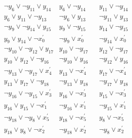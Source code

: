 \documentclass{base}
\begin{document}
\begin{align*}
	&\neg y_{6}\lor \neg y_{11}\lor y_{14} & y_{6}\lor \neg y_{14} && y_{11}\lor \neg y_{14}\\
	&y_{6}\lor y_{11}\lor \neg y_{13} & \neg y_{6} \lor y_{13} && \neg y_{11} \lor y_{13}\\
	&\neg y_{9}\lor \neg y_{14}\lor y_{15} & y_{9}\lor \neg y_{15} && y_{14}\lor \neg y_{15}\\
	&y_{9}\lor y_{14}\lor \neg x{_0^'} & \neg y_{9} \lor  x{_0^'} && \neg y_{14} \lor  x{_0^'}\\
	&\neg y_{10}\lor \neg y_{12}\lor y_{17} & y_{10}\lor \neg y_{17} && y_{12}\lor \neg y_{17}\\
	&y_{10}\lor y_{12}\lor \neg y_{16} & \neg y_{10} \lor y_{16} && \neg y_{12} \lor y_{16}\\
	&\neg y_{13}\lor \neg y_{17}\lor x{_4^'} & y_{13}\lor \neg x{_4^'} && y_{17}\lor \neg x{_4^'}\\
	&y_{13}\lor y_{17}\lor \neg y_{18} & \neg y_{13} \lor  y_{18} && \neg y_{17} \lor y_{18}\\
	&\neg y_{16}\lor \neg y_{15}\lor x{_3^'} & y_{16}\lor \neg x{_3^'} && y_{15}\lor \neg x{_3^'}\\
	&y_{16}\lor y_{15}\lor \neg x{_1^'} & \neg y_{16} \lor x{_1^'} && \neg y_{15} \lor x{_1^'}\\
	&\neg y_{18}\lor \neg y_{8}\lor x{_5^'} & y_{18}\lor \neg x{_5^'} && y_{8}\lor \neg x{_5^'}\\
	&y_{18}\lor y_{8}\lor \neg x{_2^'} & \neg y_{18} \lor x{_2^'} && \neg y_{8} \lor x{_2^'}
\end{align*}
\end{document}
